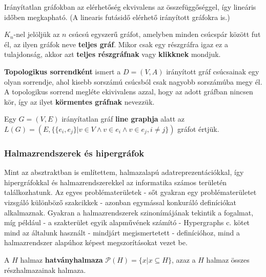 \begin{note}
Irányítatlan gráfokban az elérhetőség ekvivalens az összefüggőséggel, így lineáris időben megkapható. (A linearis futásidő elérhető irányított gráfokra is.)
\end{note}

\begin{definition}
$K_n$-nel jelöljük az $n$ csúcsú egyszerű gráfot, amelyben minden csúcspár között fut él, az ilyen gráfok neve \textbf{teljes gráf}. Mikor csak egy részgráfra igaz ez a tulajdonság, akkor azt \textbf{teljes részgráfnak} vagy \textbf{klikknek} mondjuk.
\end{definition}


\begin{definition}
\textbf{Topologikus sorrendként} ismert a $D=(V,A)$ irányított gráf csúcsainak egy olyan sorrendje, ahol kisebb sorszámú csúcsból csak nagyobb sorszámúba megy él. A topologikus sorrend megléte ekivivalens azzal, hogy az adott gráfban nincsen kör, így az ilyet \textbf{körmentes gráfnak} nevezzük.
\end{definition}

\begin{definition}
Egy $G=(V,E)$ irányítatlan gráf \textbf{line graphja} alatt az $L(G)=(E, \{ \{ e_i, e_j \} | v \in V \land v \in e_i \land v \in e_j, i \neq j \})$ gráfot értjük.
\end{definition}

\subsubsection{Halmazrendszerek és hipergráfok}

Mint az absztraktban is említettem, halmazalapú adatreprezentációkkal, így hipergráfokkal és halmazrendszerekkel az informatika számos területén találkozhatunk. Az egyes problématerületek - sőt gyakran egy problématerületet vizsgáló különböző szakcikkek - azonban egymással konkuráló definíciókat alkalmaznak. Gyakran a halmazrendszerek szinonímájának tekintik a fogalmat, míg például - a szakterület egyik alapművének számító - Hypergraphs c. \cite{berge_hypergraphs_book} kötet mind az általunk használt - mindjárt megismertetett - definícióhoz, mind a halmazrendszer alapúhoz képest megszorításokat vezet be.

\begin{definition}
A $H$ halmaz \textbf{hatványhalmaza} $\mathcal{P}(H) = \{x | x \subseteq H\}$, azaz a $H$ halmaz összes részhalmazainak halmaza.
\end{definition}

